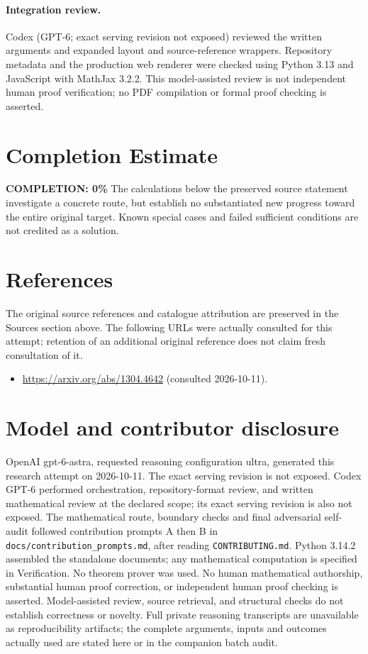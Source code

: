 \documentclass[11pt]{article}
\begin{document}
\paragraph{Integration review.} Codex (GPT-6; exact serving revision not exposed) reviewed the written arguments and expanded layout and source-reference wrappers. Repository metadata and the production web renderer were checked using Python 3.13 and JavaScript with MathJax 3.2.2. This model-assisted review is not independent human proof verification; no PDF compilation or formal proof checking is asserted.

\section{Completion Estimate}
\noindent\textbf{COMPLETION: 0\%}
The calculations below the preserved source statement investigate a concrete route,
but establish no substantiated new progress toward the entire original target.
Known special cases and failed sufficient conditions are not credited as a solution.
\section{References}
The original source references and catalogue attribution are preserved in the
Sources section above. The following URLs were actually consulted for this attempt;
retention of an additional original reference does not claim fresh consultation of it.
\begin{itemize}
\item \url{https://arxiv.org/abs/1304.4642} (consulted 2026-10-11). 
\end{itemize}
\section{Model and contributor disclosure}
OpenAI gpt-6-astra, requested reasoning configuration ultra, generated this research
attempt on 2026-10-11. The exact serving revision is not exposed. Codex GPT-6
performed orchestration, repository-format review, and written mathematical review at the declared scope; its exact serving revision
is also not exposed. The mathematical route, boundary checks and final adversarial
self-audit followed contribution prompts A then B in
\texttt{docs/contribution\_prompts.md}, after reading \texttt{CONTRIBUTING.md}.
Python 3.14.2 assembled the standalone documents; any mathematical computation is
specified in Verification. No theorem prover was used. No human mathematical
authorship, substantial human proof correction, or independent human proof checking
is asserted. Model-assisted review, source retrieval, and structural checks do not
establish correctness or novelty. Full private reasoning transcripts are unavailable
as reproducibility artifacts; the complete arguments, inputs and outcomes actually
used are stated here or in the companion batch audit.
\end{document}
